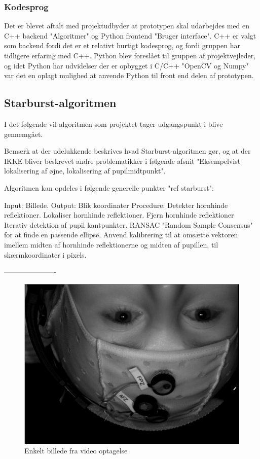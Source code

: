 \documentclass[rapport.tex]{subfiles}
\begin{document}
	\subsubsection{Kodesprog}
	Det er blevet aftalt med projektudbyder at prototypen skal udarbejdes med en C++ backend "Algoritmer" og Python frontend "Bruger interface".
	C++ er valgt som backend fordi det er et relativt hurtigt kodesprog, og fordi gruppen har tidligere erfaring
	med C++. Python blev foreslået til gruppen af projektvejleder, og idet Python har udvidelser der er opbygget
	i C/C++ "OpenCV og Numpy" var det en oplagt mulighed at anvende Python til front end delen af prototypen.
	                           
	\subsection{Starburst-algoritmen}
	I det følgende vil algoritmen som projektet tager udgangspunkt i blive gennemgået.
	
	Bemærk at der udelukkende beskrives hvad Starburst-algoritmen gør, og at der IKKE bliver beskrevet andre problematikker i følgende afsnit "Eksempelvist lokalisering af øjne, lokalisering af pupilmidtpunkt".
	
	Algoritmen kan opdeles i følgende generelle punkter "ref starburst":
	
	Input: Billede.
	Output: Blik koordinater
	Procedure:
	Detekter hornhinde reflektioner.
	Lokaliser hornhinde reflektioner.
	Fjern hornhinde reflektioner
	Iterativ detektion af pupil kantpunkter.
	RANSAC "Random Sample Consensus" for at finde en passende ellipse.
	Anvend kalibrering til at omsætte vektoren imellem midten af hornhinde reflektionerne og midten af pupillen, til skærmkoordinater i pixels.
	
	----------------------
	
	\begin{figure}
	\centering
	\includegraphics[width=0.4\linewidth]{Billeder/InitialImage.png}
	\caption{Enkelt billede fra video optagelse}
	\label{fig:InitialImage}
	\end{figure}
	
\end{document}
